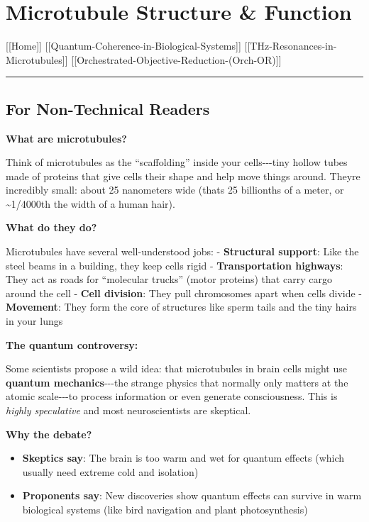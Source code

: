 \section{Microtubule Structure \&
Function}\label{microtubule-structure-function}

{[}{[}Home{]}{]} \textbar{}
{[}{[}Quantum-Coherence-in-Biological-Systems{]}{]} \textbar{}
{[}{[}THz-Resonances-in-Microtubules{]}{]} \textbar{}
{[}{[}Orchestrated-Objective-Reduction-(Orch-OR){]}{]}

\begin{center}\rule{0.5\linewidth}{0.5pt}\end{center}

\subsection{\texorpdfstring{For Non-Technical Readers
}{For Non-Technical Readers }}\label{for-non-technical-readers}

\textbf{What are microtubules?}

Think of microtubules as the ``scaffolding'' inside your
cells-\/-\/-tiny hollow tubes made of proteins that give cells their
shape and help move things around. They\textquotesingle re incredibly
small: about 25 nanometers wide (that\textquotesingle s 25 billionths of
a meter, or \textasciitilde1/4000th the width of a human hair).

\textbf{What do they do?}

Microtubules have several well-understood jobs: - \textbf{Structural
support}: Like the steel beams in a building, they keep cells rigid -
\textbf{Transportation highways}: They act as roads for ``molecular
trucks'' (motor proteins) that carry cargo around the cell -
\textbf{Cell division}: They pull chromosomes apart when cells divide -
\textbf{Movement}: They form the core of structures like sperm tails and
the tiny hairs in your lungs

\textbf{The quantum controversy:}

Some scientists propose a wild idea: that microtubules in brain cells
might use \textbf{quantum mechanics}-\/-\/-the strange physics that
normally only matters at the atomic scale-\/-\/-to process information
or even generate consciousness. This is \emph{highly speculative} and
most neuroscientists are skeptical.

\textbf{Why the debate?}

\begin{itemize}
\tightlist
\item
  \textbf{Skeptics say}: The brain is too warm and wet for quantum
  effects (which usually need extreme cold and isolation)
\item
  \textbf{Proponents say}: New discoveries show quantum effects can
  survive in warm biological systems (like bird navigation and plant
  photosynthesis)
\end{itemize}

